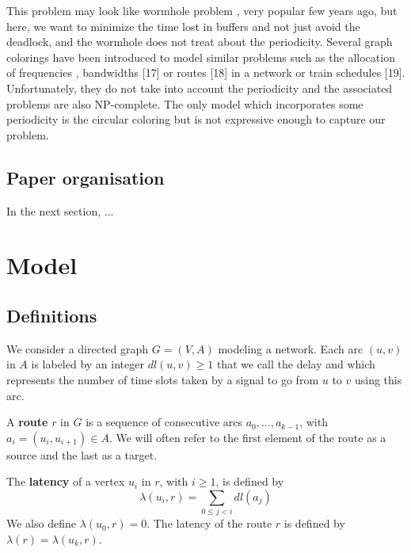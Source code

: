 \documentclass[a4paper,10pt]{article}
\begin{document}
This problem may look like wormhole problem \cite{cole1996benefit}, very popular few years ago, but here, we want to minimize the time lost in buffers and not just avoid the deadlock, and the wormhole does not treat about the periodicity. Several graph colorings have been introduced to model similar problems such as the allocation of frequencies \cite{borndorfer1998frequency}, bandwidths \cite{erlebach2001complexity}[17] or routes \cite{cole1996benefit}[18] in a network or train schedules \cite{strotmann2007railway}[19]. Unfortunately, they do not take into account the periodicity and the associated problems are also NP-complete. The only model which incorporates some periodicity is the circular coloring \cite{zhou2013multiple, zhu2001circular,zhu2006recent}but is not expressive enough to capture our problem.

\subsection*{Paper organisation}
 In the next section, ...


  

\section{Model}

  \subsection{Definitions}
  

  
	We consider a directed graph $G=(V,A)$ modeling a network. Each arc  $(u,v)$ in $A$ is labeled by an integer $dl(u,v) \geq 1$ that we call the delay and
	which represents the number of time slots taken by a signal to go from $u$ to $v$ using this arc. 
	
      A {\bf route} $r$ in $G$ is a sequence of consecutive arcs $a_0, \ldots , a_{k-1}$, with $a_i=(u_i,u_{i+1}) \in A$. 
      We will often refer to the first element of the route as a source and the last as a target.
      
      The {\bf latency} of a vertex $u_i$ in $r$, with $i \geq 1$, is defined by $$\lambda(u_i,r)= \sum\limits_{0 \leq j <i} dl(a_j)$$ We also define $\lambda(u_0,r)=0$.
      The latency of the route $r$ is defined by $\lambda (r)= \lambda (u_k,r)$.
      
\end{document}
